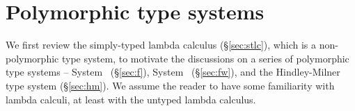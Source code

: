 \chapter{Polymorphic type systems}\label{ch:poly}
We first review the simply-typed lambda calculus (\S\ref{sec:stlc}),
which is a non-polymorphic type system, to motivate the discussions
on a series of polymorphic type systems -- System \F\ (\S\ref{sec:f}),
System \Fw\ (\S\ref{sec:fw}), and the Hindley-Milner type system
(\S\ref{sec:hm}). We assume the reader to have some familiarity with
lambda calculi, at least with the untyped lambda calculus.


